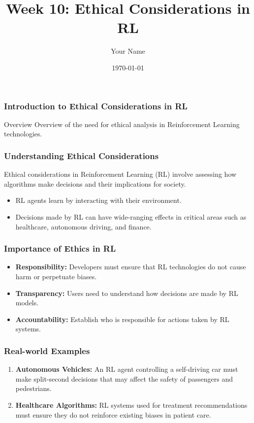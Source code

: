 \documentclass{beamer}
\title{Week 10: Ethical Considerations in RL}
\author{Your Name}
\institute{Your Institution}
\date{\today}
\begin{document}
\frame{\titlepage}

\begin{frame}[fragile]
    \frametitle{Introduction to Ethical Considerations in RL}
    \begin{block}{Overview}
        Overview of the need for ethical analysis in Reinforcement Learning technologies.
    \end{block}
\end{frame}

\begin{frame}[fragile]
    \frametitle{Understanding Ethical Considerations}
    Ethical considerations in Reinforcement Learning (RL) involve assessing how algorithms make decisions and their implications for society.
    \begin{itemize}
        \item RL agents learn by interacting with their environment.
        \item Decisions made by RL can have wide-ranging effects in critical areas such as healthcare, autonomous driving, and finance.
    \end{itemize}
\end{frame}

\begin{frame}[fragile]
    \frametitle{Importance of Ethics in RL}
    \begin{itemize}
        \item \textbf{Responsibility:} Developers must ensure that RL technologies do not cause harm or perpetuate biases.
        \item \textbf{Transparency:} Users need to understand how decisions are made by RL models.
        \item \textbf{Accountability:} Establish who is responsible for actions taken by RL systems.
    \end{itemize}
\end{frame}

\begin{frame}[fragile]
    \frametitle{Real-world Examples}
    \begin{enumerate}
        \item \textbf{Autonomous Vehicles:} 
        An RL agent controlling a self-driving car must make split-second decisions that may affect the safety of passengers and pedestrians.
        \item \textbf{Healthcare Algorithms:} 
        RL systems used for treatment recommendations must ensure they do not reinforce existing biases in patient care.
    \end{enumerate}
\end{frame}
\end{document}

